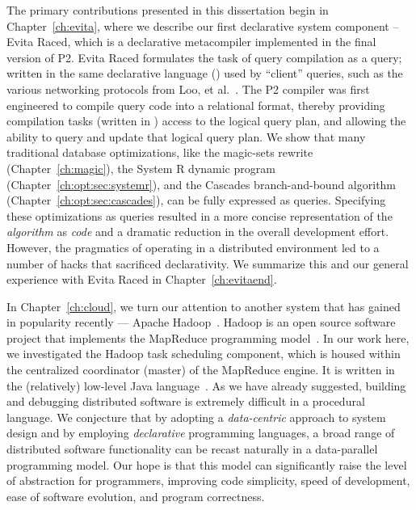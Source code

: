 The primary contributions presented in this dissertation begin in
Chapter~\ref{ch:evita}, where we describe our first declarative system
component -- Evita Raced, which is a declarative metacompiler implemented in
the final version of P2.  Evita Raced formulates the task of query compilation
as a query; written in the same declarative language (\OVERLOG) used by
``client'' queries, such as the various networking protocols from Loo, et
al.~\cite{loo-sigmod06, p2:sosp}.  The P2 compiler was first engineered to
compile query code into a relational format, thereby providing compilation
tasks (written in \OVERLOG) access to the logical query plan, and allowing the
ability to query and update that logical query plan.  We show that many
traditional database optimizations, like the magic-sets rewrite
(Chapter~\ref{ch:magic}), the System R dynamic program
(Chapter~\ref{ch:opt:sec:systemr}), and the Cascades branch-and-bound algorithm
(Chapter~\ref{ch:opt:sec:cascades}), can be fully expressed as \OVERLOG
queries.  Specifying these optimizations as \OVERLOG queries resulted in a more
concise representation of the {\em algorithm} as {\em code} and a dramatic
reduction in the overall development effort.  However, the pragmatics of
operating in a distributed environment led to a number of hacks that sacrificed
declarativity.  We summarize this and our general experience with Evita Raced in
Chapter~\ref{ch:evitaend}.
 
In Chapter~\ref{ch:cloud}, we turn our attention to another system that has
gained in popularity recently --- Apache Hadoop~\cite{hadoop}.  Hadoop is an
open source software project that implements the MapReduce programming
model~\cite{mapreduce-osdi}.  In our work here, we investigated the Hadoop task
scheduling component, which is housed within the centralized coordinator
(master) of the MapReduce engine.  It is written in the (relatively) low-level
Java language~\cite{java}.  As we have already suggested, building and
debugging distributed software is extremely difficult in a procedural language.
We conjecture that by adopting a {\em data-centric} approach to system design
and by employing {\em declarative} programming languages, a broad range of
distributed software functionality can be recast naturally in a data-parallel
programming model.  Our hope is that this model can significantly raise the
level of abstraction for programmers, improving code simplicity, speed of
development, ease of software evolution, and program correctness.

